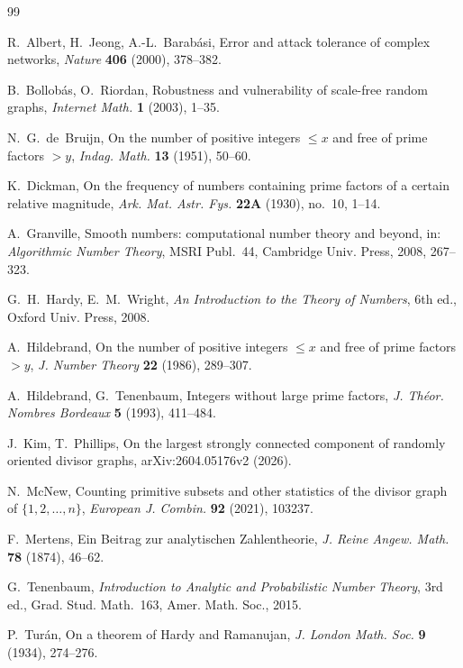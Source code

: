\documentclass[11pt]{amsart}
\theoremstyle{definition}
\begin{document}
\begin{thebibliography}{99}

 R.~Albert, H.~Jeong, A.-L.~Barab\'asi, Error and attack tolerance of complex networks, \emph{Nature} \textbf{406} (2000), 378--382.

 B.~Bollob\'as, O.~Riordan, Robustness and vulnerability of scale-free random graphs, \emph{Internet Math.} \textbf{1} (2003), 1--35.

 N.~G.~de~Bruijn, On the number of positive integers $\le x$ and free of prime factors $>y$, \emph{Indag. Math.} \textbf{13} (1951), 50--60.

 K.~Dickman, On the frequency of numbers containing prime factors of a certain relative magnitude, \emph{Ark. Mat. Astr. Fys.} \textbf{22A} (1930), no.~10, 1--14.

 A.~Granville, Smooth numbers: computational number theory and beyond, in: \emph{Algorithmic Number Theory}, MSRI Publ.~44, Cambridge Univ. Press, 2008, 267--323.

 G.~H.~Hardy, E.~M.~Wright, \emph{An Introduction to the Theory of Numbers}, 6th ed., Oxford Univ. Press, 2008.

 A.~Hildebrand, On the number of positive integers $\le x$ and free of prime factors $>y$, \emph{J. Number Theory} \textbf{22} (1986), 289--307.

 A.~Hildebrand, G.~Tenenbaum, Integers without large prime factors, \emph{J. Th\'eor. Nombres Bordeaux} \textbf{5} (1993), 411--484.

 J.~Kim, T.~Phillips, On the largest strongly connected component of randomly oriented divisor graphs, arXiv:2604.05176v2 (2026).

 N.~McNew, Counting primitive subsets and other statistics of the divisor graph of $\{1,2,\dots,n\}$, \emph{European J. Combin.} \textbf{92} (2021), 103237.

 F.~Mertens, Ein Beitrag zur analytischen Zahlentheorie, \emph{J. Reine Angew. Math.} \textbf{78} (1874), 46--62.

 G.~Tenenbaum, \emph{Introduction to Analytic and Probabilistic Number Theory}, 3rd ed., Grad. Stud. Math.~163, Amer. Math. Soc., 2015.

 P.~Tur\'an, On a theorem of Hardy and Ramanujan, \emph{J. London Math. Soc.} \textbf{9} (1934), 274--276.

\end{thebibliography}
\end{document}
